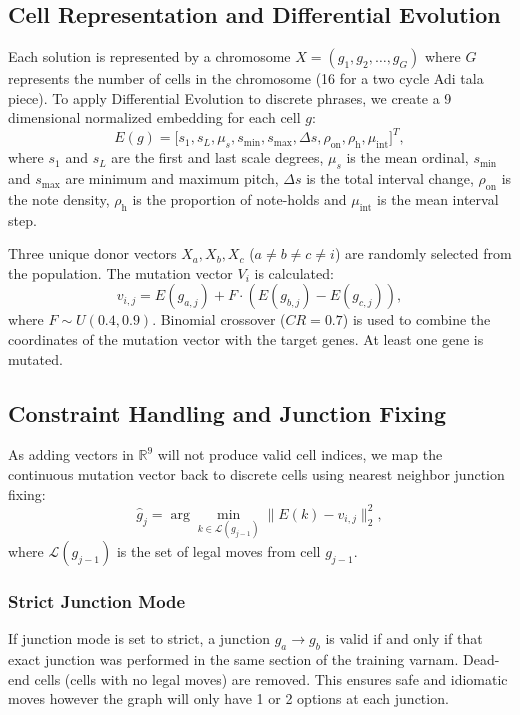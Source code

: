 \documentclass[conference,letterpaper]{IEEEtran}
\begin{document}
\subsection{Cell Representation and Differential Evolution}
Each solution is represented by a chromosome $X = (g_1, g_2, \dots, g_G)$ where $G$ represents the number of cells in the chromosome (16 for a two cycle Adi tala piece). To apply Differential Evolution to discrete phrases, we create a 9 dimensional normalized embedding for each cell $g$:
\begin{equation}
 E(g) = \big[ s_1, s_L, \mu_s, s_{\min}, s_{\max}, \Delta s, \rho_{\text{on}}, \rho_{\text{h}}, \mu_{\text{int}} \big]^T,
\end{equation}
where $s_1$ and $s_L$ are the first and last scale degrees, $\mu_s$ is the mean ordinal, $s_{\min}$ and $s_{\max}$ are minimum and maximum pitch, $\Delta s$ is the total interval change, $\rho_{\text{on}}$ is the note density, $\rho_{\text{h}}$ is the proportion of note-holds and $\mu_{\text{int}}$ is the mean interval step.

Three unique donor vectors $X_a, X_b, X_c$ ($a \neq b \neq c \neq i$) are randomly selected from the population. The mutation vector $V_i$ is calculated:
\begin{equation}
 v_{i,j} = E(g_{a,j}) + F \cdot \left( E(g_{b,j}) - E(g_{c,j}) \right),
 \label{eq:mutation}
\end{equation}
where $F \sim U(0.4, 0.9)$. Binomial crossover ($CR = 0.7$) is used to combine the coordinates of the mutation vector with the target genes. At least one gene is mutated.

\subsection{Constraint Handling and Junction Fixing}
As adding vectors in $\mathbb{R}^9$ will not produce valid cell indices, we map the continuous mutation vector back to discrete cells using nearest neighbor junction fixing:
\begin{equation}
 \hat{g}_j = \arg\min_{k \in \mathcal{L}(g_{j-1})} \| E(k) - v_{i,j} \|_2^2,
 \label{eq:snap}
\end{equation}
where $\mathcal{L}(g_{j-1})$ is the set of legal moves from cell $g_{j-1}$.

\subsubsection{Strict Junction Mode}
If junction mode is set to strict, a junction $g_a \rightarrow g_b$ is valid if and only if that exact junction was performed in the same section of the training varnam. Dead-end cells (cells with no legal moves) are removed. This ensures safe and idiomatic moves however the graph will only have 1 or 2 options at each junction.
\end{document}
